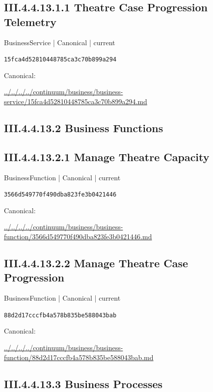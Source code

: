 \documentclass[10pt,a4paper]{article}
\begin{document}
\subsection*{III.4.4.13.1.1 Theatre Case Progression Telemetry}
\label{element-15fca4d52810448785ca3c70b899a294}
{\small BusinessService | Canonical | current}\par
\texttt{15fca4d52810448785ca3c70b899a294}\par
Canonical: \par
{\footnotesize\url{../../../../continuum/business/business-service/15fca4d52810448785ca3c70b899a294.md}}\par
\subsection*{III.4.4.13.2 Business Functions}
\subsection*{III.4.4.13.2.1 Manage Theatre Capacity}
\label{element-3566d549770f490dba823fe3b0421446}
{\small BusinessFunction | Canonical | current}\par
\texttt{3566d549770f490dba823fe3b0421446}\par
Canonical: \par
{\footnotesize\url{../../../../continuum/business/business-function/3566d549770f490dba823fe3b0421446.md}}\par
\subsection*{III.4.4.13.2.2 Manage Theatre Case Progression}
\label{element-88d2d17cccfb4a578b835be588043bab}
{\small BusinessFunction | Canonical | current}\par
\texttt{88d2d17cccfb4a578b835be588043bab}\par
Canonical: \par
{\footnotesize\url{../../../../continuum/business/business-function/88d2d17cccfb4a578b835be588043bab.md}}\par
\subsection*{III.4.4.13.3 Business Processes}
\end{document}
